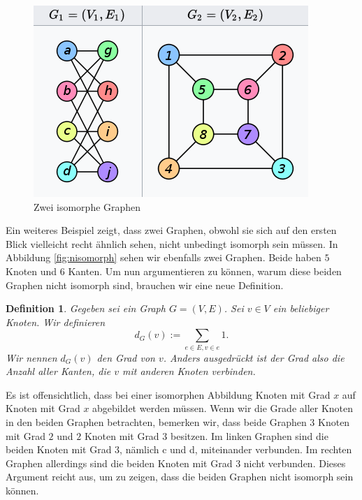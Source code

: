 \documentclass[a4paper]{article}
\newtheorem{definition}{Definition}
\begin{document}
\begin{figure}
\centering
\includegraphics[scale=0.8]{isomorph.png}
\caption{Zwei isomorphe Graphen}\label{fig:isomorph}
\end{figure}


Ein weiteres Beispiel zeigt, dass zwei Graphen, obwohl sie sich auf den ersten Blick vielleicht recht ähnlich sehen, nicht unbedingt isomorph sein müssen. In Abbildung \ref{fig:nisomorph} sehen wir ebenfalls zwei Graphen. Beide haben $5$ Knoten und $6$ Kanten. Um nun argumentieren zu können, warum diese beiden Graphen nicht isomorph sind, brauchen wir eine neue Definition.

\begin{definition}
Gegeben sei ein Graph $G = (V,E)$. Sei $v\in V$ ein beliebiger Knoten. Wir definieren $$d_G(v) := \sum_{e\in E, v\in e} 1.$$
Wir nennen $d_G(v)$ den Grad von $v$. Anders ausgedrückt ist der Grad also die Anzahl aller Kanten, die $v$ mit anderen Knoten verbinden.
\end{definition}

Es ist offensichtlich, dass bei einer isomorphen Abbildung Knoten mit Grad $x$ auf Knoten mit Grad $x$ abgebildet werden müssen.
Wenn wir die Grade aller Knoten in den beiden Graphen betrachten, bemerken wir, dass beide Graphen $3$ Knoten mit Grad $2$ und $2$ Knoten mit Grad $3$ besitzen. Im linken Graphen sind die beiden Knoten mit Grad $3$, nämlich c und d, miteinander verbunden. Im rechten Graphen allerdings sind die beiden Knoten mit Grad $3$ nicht verbunden. Dieses Argument reicht aus, um zu zeigen, dass die beiden Graphen nicht isomorph sein können. 
\end{document}
